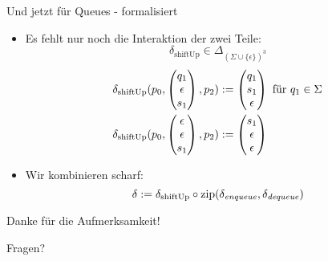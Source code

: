 \documentclass{beamer}
\DeclareMathOperator{\zip}{zip}
\begin{document}
\begin{frame}{Und jetzt für Queues - formalisiert}
    \begin{itemize}
        \item Es fehlt nur noch die Interaktion der zwei Teile:
            \[ \delta_\text{shiftUp} \in \Delta_{(\Sigma \cup \{\epsilon\})^3} \]
            \begin{align*}
                \delta_\text{shiftUp}(p_0,\begin{pmatrix}q_1\\\epsilon\\s_1\end{pmatrix},p_2) &:= \begin{pmatrix}q_1\\s_1\\\epsilon\end{pmatrix} \text{ für } q_1 \in \Sigma\\
                \delta_\text{shiftUp}(p_0,\begin{pmatrix}\epsilon\\\epsilon\\s_1\end{pmatrix},p_2) &:= \begin{pmatrix}s_1\\\epsilon\\\epsilon\end{pmatrix}
            \end{align*}
        \item Wir kombinieren scharf:
            \[ \delta := \delta_\text{shiftUp} \circ \zip(\delta_\enqueue,\delta_\dequeue) \]
    \end{itemize}
\end{frame}

\begin{frame}{Danke für die Aufmerksamkeit!}
    \begin{center}
        Fragen?
    \end{center}
\end{frame}
\end{document}
